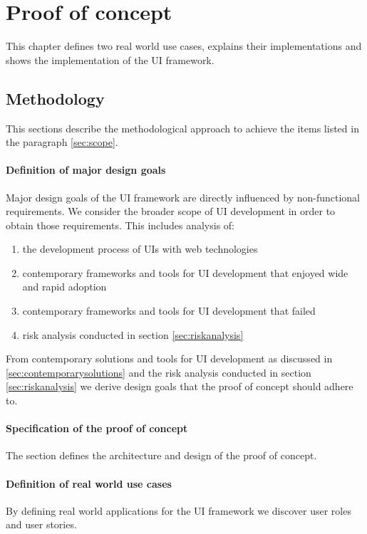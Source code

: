 \section{Proof of concept}\label{sec:proofofconcept}
This chapter defines two real world use cases, explains their implementations and shows the implementation of the UI framework.

\subsection{Methodology}
This sections describe the methodological approach to achieve the items listed in the paragraph \ref{sec:scope}.

\paragraph{Definition of major design goals}
Major design goals of the UI framework are directly influenced by non-functional requirements. We consider the broader scope of UI development in order to obtain those requirements. This includes analysis of:

\begin{enumerate}
  \item the development process of UIs with web technologies
  \item contemporary frameworks and tools for UI development that enjoyed wide and rapid adoption
  \item contemporary frameworks and tools for UI development that failed
  \item risk analysis conducted in section \ref{sec:riskanalysis}
\end{enumerate}

From contemporary solutions and tools for UI development as discussed in \ref{sec:contemporarysolutions} and the risk analysis conducted in section \ref{sec:riskanalysis} we derive design goals that the proof of concept should adhere to.

\paragraph{Specification of the proof of concept}
The section defines the architecture and design of the proof of concept.

\paragraph{Definition of real world use cases}
By defining real world applications for the UI framework we discover user roles and user stories.

